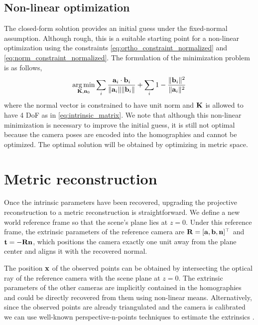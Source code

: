 \documentclass[10pt,twocolumn,letterpaper]{article}
\begin{document}
\subsection{Non-linear optimization}

The closed-form solution provides an initial guess under the fixed-normal assumption. Although rough, this is a suitable starting point for a non-linear optimization using the constraints \eqref{eq:ortho_constraint_normalized} and \eqref{eq:norm_constraint_normalized}. The formulation of the minimization problem is as follows, 
%
\begin{align}
\operatorname*{arg\,min}_{\mathbf{K},\mathbf{n}_0} 
\sum_i 
\frac{\mathbf{a}_i \cdot \mathbf{b}_i}{\lVert\mathbf{a}_i\rVert \lVert\mathbf{b}_i\rVert} +
\sum_i 
1 - \frac{\lVert\mathbf{b}_i\rVert^2}{\lVert\mathbf{a}_i\rVert^2}
\label{eq:calib_ba}
\end{align}
%
where the normal vector is constrained to have unit norm and $\mathbf{K}$ is allowed to have 4 DoF as in \eqref{eq:intrinsic_matrix}. We note that although this non-linear minimization is necessary to improve the initial guess, it is still not optimal because the camera poses are encoded into the homographies and cannot be optimized. The optimal solution will be obtained by optimizing in metric space.

\section{Metric reconstruction}
\label{section:metric}

Once the intrinsic parameters have been recovered, upgrading the projective reconstruction to a metric reconstruction is straightforward. We define a new world reference frame so that the scene's plane lies at $z=0$. Under this reference frame, the extrinsic parameters of the reference camera are $\mathbf{R}=[\mathbf{a}, \mathbf{b}, \mathbf{n}]^\top$ and $\mathbf{t}= - \mathbf{R} \mathbf{n}$, which positions the camera exactly one unit away from the plane center and aligns it with the recovered normal.

The position $\mathbf{x}$ of the observed points can be obtained by intersecting the optical ray of the reference camera with the scene plane at $z=0$. The extrinsic parameters of the other cameras are implicitly contained in the homographies and could be directly recovered from them using non-linear means. Alternatively, since the observed points are already triangulated and the camera is calibrated we can use well-known perspective-n-points techniques to estimate the extrinsics \cite{quan1999}.
\end{document}
